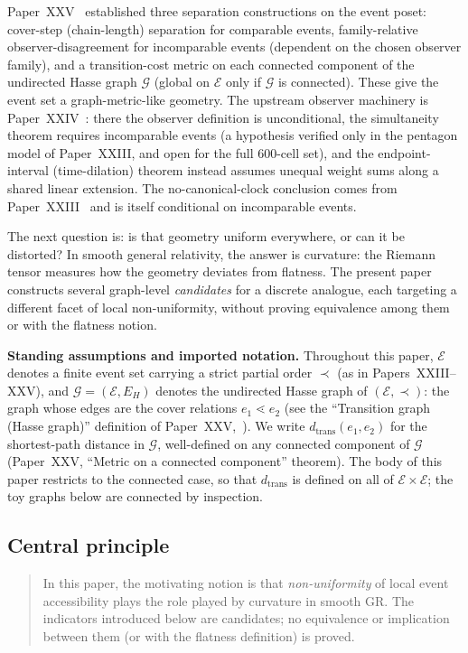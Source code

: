 \documentclass[12pt]{article}
\newcommand{\Ecal}{\mathcal{E}}
\newcommand{\Gcal}{\mathcal{G}}
\begin{document}
Paper~XXV~\citep{SmartXXV} established three separation constructions on the event poset: cover-step (chain-length) separation for comparable events, family-relative observer-disagreement for incomparable events (dependent on the chosen observer family), and a transition-cost metric on each connected component of the undirected Hasse graph $\Gcal$ (global on $\Ecal$ only if $\Gcal$ is connected). These give the event set a graph-metric-like geometry. The upstream observer machinery is Paper~XXIV~\citep{SmartXXIV}: there the observer definition is unconditional, the simultaneity theorem requires incomparable events (a hypothesis verified only in the pentagon model of Paper~XXIII, and open for the full 600-cell set), and the endpoint-interval (time-dilation) theorem instead assumes unequal weight sums along a shared linear extension. The no-canonical-clock conclusion comes from Paper~XXIII~\citep{SmartXXIII} and is itself conditional on incomparable events.

The next question is: is that geometry uniform everywhere, or can it be distorted? In smooth general relativity, the answer is curvature: the Riemann tensor measures how the geometry deviates from flatness. The present paper constructs several graph-level \emph{candidates} for a discrete analogue, each targeting a different facet of local non-uniformity, without proving equivalence among them or with the flatness notion.

\medskip
\noindent\textbf{Standing assumptions and imported notation.} Throughout this paper, $\Ecal$ denotes a finite event set carrying a strict partial order $\prec$ (as in Papers~XXIII--XXV), and $\Gcal = (\Ecal, E_H)$ denotes the undirected Hasse graph of $(\Ecal, \prec)$: the graph whose edges are the cover relations $e_1 \lessdot e_2$ (see the ``Transition graph (Hasse graph)'' definition of Paper~XXV,~\citealt{SmartXXV}). We write $d_{\mathrm{trans}}(e_1, e_2)$ for the shortest-path distance in $\Gcal$, well-defined on any connected component of $\Gcal$ (Paper~XXV, ``Metric on a connected component'' theorem). The body of this paper restricts to the connected case, so that $d_{\mathrm{trans}}$ is defined on all of $\Ecal \times \Ecal$; the toy graphs below are connected by inspection.
\medskip


\subsection*{Central principle}

\begin{quote}
In this paper, the motivating notion is that \emph{non-uniformity} of local event accessibility plays the role played by curvature in smooth GR. The indicators introduced below are candidates; no equivalence or implication between them (or with the flatness definition) is proved.
\end{quote}
\end{document}
